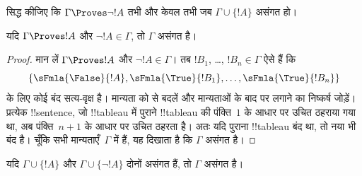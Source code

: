 \documentclass[../../../include/open-logic-section]{subfiles}
\begin{document}
\begin{prob}
सिद्ध कीजिए कि $\Gamma \Proves \lnot !A$ तभी और केवल तभी जब
$\Gamma \cup \{!A\}$ असंगत हो।
\end{prob}

\begin{prop}
  यदि $\Gamma \Proves !A$ और $\lnot !A \in \Gamma$, तो $\Gamma$ असंगत है।
\end{prop}

\begin{proof}
  मान लें $\Gamma \Proves !A$ और $\lnot !A \in \Gamma$। तब
  $!B_1$, \dots, $!B_n \in \Gamma$ ऐसे हैं कि \
  \[
  \{\sFmla{\False}{!A}, \sFmla{\True}{!B_1}, \dots, \sFmla{\True}{!B_n}\}
  \]
  के लिए कोई बंद सत्य-वृक्ष है। मान्यता  को
   से बदलें और मान्यताओं के बाद
  \sFmla{\False}{!A} पर \TRule{\True}{\lnot} लगाने का निष्कर्ष जोड़ें।
  प्रत्येक !!{sentence}, जो !!{tableau} में पुराने !!{tableau} की
  पंक्ति~$1$ के आधार पर उचित ठहराया गया था, अब पंक्ति~$n+1$ के आधार पर उचित
  ठहरता है। अतः यदि पुराना !!{tableau} बंद था, तो नया भी बंद है। चूँकि सभी मान्यताएँ~$\Gamma$ में
  हैं, यह दिखाता है कि $\Gamma$ असंगत है।
\end{proof}

\begin{prop}
  यदि $\Gamma \cup \{!A\}$ और $\Gamma \cup \{\lnot !A\}$ दोनों असंगत हैं,
  तो $\Gamma$ असंगत है।
\end{prop}
\end{document}
